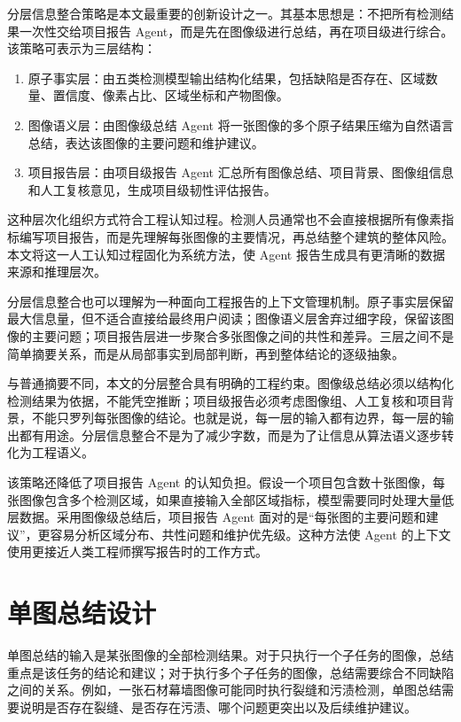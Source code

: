 分层信息整合策略是本文最重要的创新设计之一。其基本思想是：不把所有检测结果一次性交给项目报告 Agent，而是先在图像级进行总结，再在项目级进行综合。该策略可表示为三层结构：

\begin{enumerate}
  \item 原子事实层：由五类检测模型输出结构化结果，包括缺陷是否存在、区域数量、置信度、像素占比、区域坐标和产物图像。
  \item 图像语义层：由图像级总结 Agent 将一张图像的多个原子结果压缩为自然语言总结，表达该图像的主要问题和维护建议。
  \item 项目报告层：由项目级报告 Agent 汇总所有图像总结、项目背景、图像组信息和人工复核意见，生成项目级韧性评估报告。
\end{enumerate}

这种层次化组织方式符合工程认知过程。检测人员通常也不会直接根据所有像素指标编写项目报告，而是先理解每张图像的主要情况，再总结整个建筑的整体风险。本文将这一人工认知过程固化为系统方法，使 Agent 报告生成具有更清晰的数据来源和推理层次。

分层信息整合也可以理解为一种面向工程报告的上下文管理机制。原子事实层保留最大信息量，但不适合直接给最终用户阅读；图像语义层舍弃过细字段，保留该图像的主要问题；项目报告层进一步聚合多张图像之间的共性和差异。三层之间不是简单摘要关系，而是从局部事实到局部判断，再到整体结论的逐级抽象。

与普通摘要不同，本文的分层整合具有明确的工程约束。图像级总结必须以结构化检测结果为依据，不能凭空推断；项目级报告必须考虑图像组、人工复核和项目背景，不能只罗列每张图像的结论。也就是说，每一层的输入都有边界，每一层的输出都有用途。分层信息整合不是为了减少字数，而是为了让信息从算法语义逐步转化为工程语义。

该策略还降低了项目报告 Agent 的认知负担。假设一个项目包含数十张图像，每张图像包含多个检测区域，如果直接输入全部区域指标，模型需要同时处理大量低层数据。采用图像级总结后，项目报告 Agent 面对的是“每张图的主要问题和建议”，更容易分析区域分布、共性问题和维护优先级。这种方法使 Agent 的上下文使用更接近人类工程师撰写报告时的工作方式。

\section{单图总结设计}
\label{sec:image-summary-design}

单图总结的输入是某张图像的全部检测结果。对于只执行一个子任务的图像，总结重点是该任务的结论和建议；对于执行多个子任务的图像，总结需要综合不同缺陷之间的关系。例如，一张石材幕墙图像可能同时执行裂缝和污渍检测，单图总结需要说明是否存在裂缝、是否存在污渍、哪个问题更突出以及后续维护建议。

